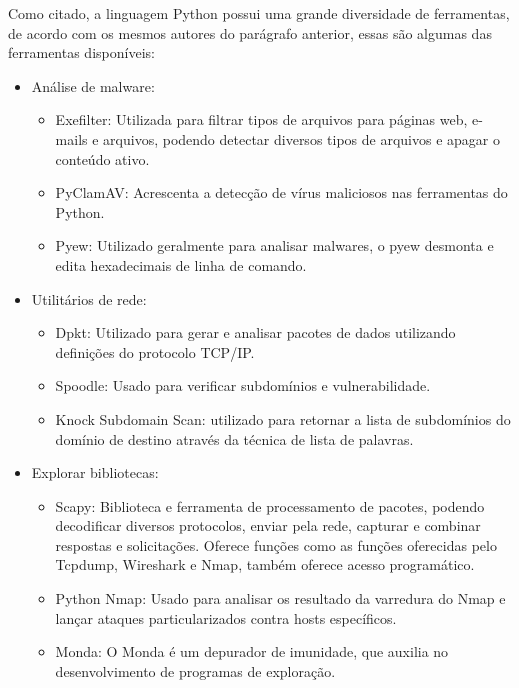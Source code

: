         Como citado, a linguagem Python possui uma grande diversidade de ferramentas, de acordo com os mesmos autores do parágrafo anterior, essas são algumas das ferramentas disponíveis:
        \begin{itemize}
        \item Análise de malware:
        	\begin{itemize}
        		\item Exefilter: Utilizada para filtrar  tipos de arquivos para páginas web, e-mails e arquivos, podendo detectar diversos tipos de arquivos e apagar o conteúdo ativo.
        		
        		\item PyClamAV: Acrescenta a detecção de vírus maliciosos nas ferramentas do Python.
        		
        		\item Pyew: Utilizado geralmente para analisar malwares, o pyew desmonta e edita hexadecimais de linha de comando.
        	\end{itemize}
        
        \item Utilitários de rede:
        	\begin{itemize}
        		\item Dpkt: Utilizado para gerar e analisar pacotes de dados utilizando definições do protocolo TCP/IP.
        		\item Spoodle: Usado para verificar subdomínios e vulnerabilidade.
        		\item Knock Subdomain Scan: utilizado para retornar a lista de subdomínios do domínio de destino através da técnica de lista de palavras.
        	\end{itemize}
        
        \item Explorar bibliotecas:
        	\begin{itemize}
        		\item Scapy: Biblioteca e ferramenta de processamento de pacotes, podendo decodificar diversos protocolos, enviar pela rede, capturar e combinar respostas e solicitações. Oferece funções como as funções oferecidas pelo Tcpdump, Wireshark e Nmap, também oferece acesso programático.
        		
        		\item Python Nmap: Usado para analisar os resultado da varredura do Nmap e lançar ataques particularizados contra hosts específicos.
        		
        		\item Monda: O Monda é um depurador de imunidade, que auxilia no desenvolvimento de programas de exploração.
        		

\end{itemize}
\end{itemize}
